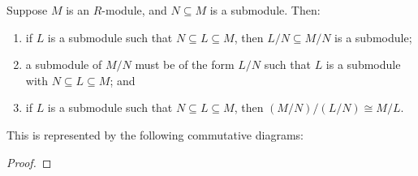 \begin{theorem}\label{thm:iso-3-mod}
    Suppose \(M\) is an \(R\)-module,
    and \(N \subseteq M\) is a submodule.
    Then:
    \begin{enumerate}[label={(\alph*)}, itemsep=0mm]
        \item if \(L\) is a submodule such that \(N \subseteq L \subseteq M\),
            then \(L/N \subseteq M/N\) is a submodule;
        \item a submodule of \(M/N\) must be of the form \(L/N\)
            such that \(L\) is a submodule with \(N \subseteq L \subseteq M\); and
        \item if \(L\) is a submodule such that \(N \subseteq L \subseteq M\),
            then \((M/N)/(L/N) \cong M/L\).
    \end{enumerate}

    This is represented by the following commutative diagrams:
    \begin{center}
    \end{center}
\end{theorem}
\begin{proof}
    
\end{proof}






